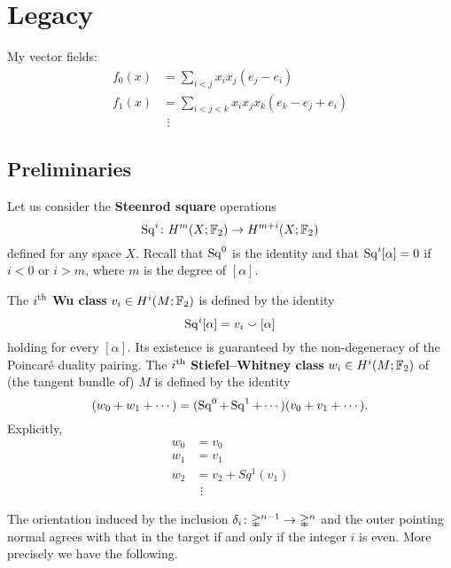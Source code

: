 
\appendix
\newpage
\section*{Legacy}

\fline

My vector fields:
\begin{align*}
	f_0(x) &= \sum_{i < j} x_i x_j (e_j - e_i) \\
	f_1(x) &= \sum_{i < j < k} x_i x_j x_k (e_k - e_j + e_i) \\
	&\ \, \vdots
\end{align*}

\fline

\subsection*{Preliminaries}

Let us consider the \textbf{Steenrod square} operations
\[
\operatorname{Sq}^i \colon H^m(X; {\mathbb{F}_2}) \to H^{m+i}(X; {\mathbb{F}_2})
\]
defined for any space $X$.
Recall that $\operatorname{Sq}^0$ is the identity and that $\operatorname{Sq}^i[\alpha] = 0$ if $i < 0$ or $i > m$, where $m$ is the degree of $[\alpha]$.

The $i^{\mathrm{th}}$ \textbf{Wu class} $v_i \in H^i(M; {\mathbb{F}_2})$ is defined by the identity
\[
\operatorname{Sq}^i [\alpha] = v_i \smallsmile [\alpha]
\]
holding for every $[\alpha]$.
Its existence is guaranteed by the non-degeneracy of the Poincar\'e duality pairing.
The $i^{\mathrm{th}}$ \textbf{Stiefel--Whitney class} $w_i \in H^i(M; {\mathbb{F}_2})$ of (the tangent bundle of) $M$ is defined by the identity
\[
(w_0 + w_1 + \dotsb) = (\operatorname{Sq}^0 + \operatorname{Sq}^1 + \dotsb)(v_0 + v_1 + \dotsb).
\]
Explicitly,
\begin{align*}
w_0 &= v_0 \\
w_1 &= v_1 \\
w_2 &= v_2 + Sq^1(v_1) \\
& \ \, \vdots
\end{align*}

\fline

The orientation induced by the inclusion $\delta_i \colon \mathbb{\Delta}^{n-1} \to \mathbb{\Delta}^n$ and the outer pointing normal agrees with that in the target if and only if the integer $i$ is even.
More precisely we have the following.

\fline